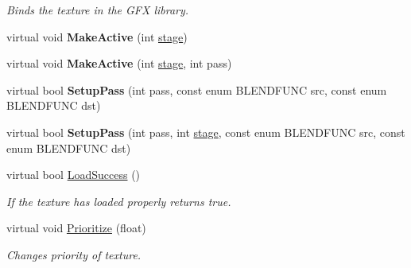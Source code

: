 \begin{DoxyCompactItemize}
\begin{DoxyCompactList}\small\item\em Binds the texture in the G\+FX library. \end{DoxyCompactList}\item 
virtual void {\bfseries Make\+Active} (int \hyperlink{classTexture_aa38999434f9fcf409ca20b4523852b7b}{stage})\hypertarget{classTexture_ae083c91307c6c90808716512a47d36f9}{}\label{classTexture_ae083c91307c6c90808716512a47d36f9}

\item 
virtual void {\bfseries Make\+Active} (int \hyperlink{classTexture_aa38999434f9fcf409ca20b4523852b7b}{stage}, int pass)\hypertarget{classTexture_a1ae482eda855a59c51d4107c5f999257}{}\label{classTexture_a1ae482eda855a59c51d4107c5f999257}

\item 
virtual bool {\bfseries Setup\+Pass} (int pass, const enum B\+L\+E\+N\+D\+F\+U\+NC src, const enum B\+L\+E\+N\+D\+F\+U\+NC dst)\hypertarget{classTexture_a7e666fc7111ec55f5f697b54b09ad8e2}{}\label{classTexture_a7e666fc7111ec55f5f697b54b09ad8e2}

\item 
virtual bool {\bfseries Setup\+Pass} (int pass, int \hyperlink{classTexture_aa38999434f9fcf409ca20b4523852b7b}{stage}, const enum B\+L\+E\+N\+D\+F\+U\+NC src, const enum B\+L\+E\+N\+D\+F\+U\+NC dst)\hypertarget{classTexture_af1317a9badd9f131e7efd0fda4bb84a7}{}\label{classTexture_af1317a9badd9f131e7efd0fda4bb84a7}

\item 
virtual bool \hyperlink{classTexture_afaf6605b891adcd286a1f5cba1a4eb8b}{Load\+Success} ()\hypertarget{classTexture_afaf6605b891adcd286a1f5cba1a4eb8b}{}\label{classTexture_afaf6605b891adcd286a1f5cba1a4eb8b}

\begin{DoxyCompactList}\small\item\em If the texture has loaded properly returns true. \end{DoxyCompactList}\item 
virtual void \hyperlink{classTexture_a9d88413bd0033594e3387337e49569b1}{Prioritize} (float)\hypertarget{classTexture_a9d88413bd0033594e3387337e49569b1}{}\label{classTexture_a9d88413bd0033594e3387337e49569b1}

\begin{DoxyCompactList}\small\item\em Changes priority of texture. \end{DoxyCompactList}\end{DoxyCompactItemize}
